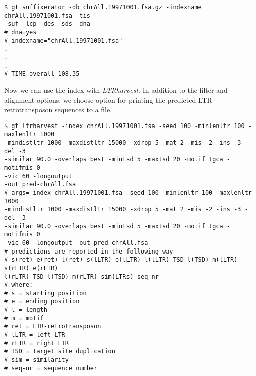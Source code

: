 \documentclass[12pt,titlepage]{article}
\newcommand{\LTRharvest}{\textit{LTRharvest}\xspace}
\begin{document}
\begin{footnotesize}
\begin{verbatim}
$ gt suffixerator -db chrAll.19971001.fsa.gz -indexname chrAll.19971001.fsa -tis
-suf -lcp -des -sds -dna
# dna=yes
# indexname="chrAll.19971001.fsa"
.
.
.
# TIME overall 108.35
\end{verbatim}
\end{footnotesize}

Now we can use the index with \LTRharvest. In addition to the filter and
alignment options, we choose option  for printing the predicted
LTR retrotransposon sequences to a file.

\begin{footnotesize}
\begin{verbatim}
$ gt ltrharvest -index chrAll.19971001.fsa -seed 100 -minlenltr 100 -maxlenltr 1000
-mindistltr 1000 -maxdistltr 15000 -xdrop 5 -mat 2 -mis -2 -ins -3 -del -3
-similar 90.0 -overlaps best -mintsd 5 -maxtsd 20 -motif tgca -motifmis 0
-vic 60 -longoutput
-out pred-chrAll.fsa
# args=-index chrAll.19971001.fsa -seed 100 -minlenltr 100 -maxlenltr 1000
-mindistltr 1000 -maxdistltr 15000 -xdrop 5 -mat 2 -mis -2 -ins -3 -del -3
-similar 90.0 -overlaps best -mintsd 5 -maxtsd 20 -motif tgca -motifmis 0
-vic 60 -longoutput -out pred-chrAll.fsa
# predictions are reported in the following way
# s(ret) e(ret) l(ret) s(lLTR) e(lLTR) l(lLTR) TSD l(TSD) m(lLTR) s(rLTR) e(rLTR)
l(rLTR) TSD l(TSD) m(rLTR) sim(LTRs) seq-nr
# where:                                                                                                                                                    # s = starting position                                                                                                                                     # e = ending position                                                                                                                                       # l = length                                                                                                                                                # m = motif                                                                                                                                                 # ret = LTR-retrotransposon                                                                                                                                 # lLTR = left LTR                                                                                                                                           # rLTR = right LTR                                                                                                                                          # TSD = target site duplication                                                                                                                             # sim = similarity                                                                                                                                          # seq-nr = sequence number

\end{verbatim}
\end{footnotesize}
\end{document}
